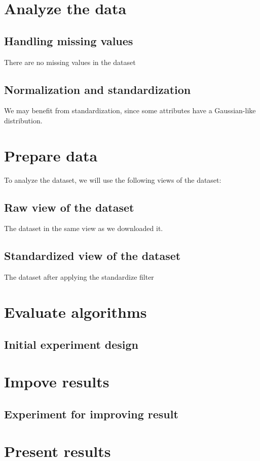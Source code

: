 \chapter{Analyze the data}
\section{Handling missing values}
There are no missing values in the dataset
\section{Normalization and standardization}
We may benefit from standardization, since some attributes have a Gaussian-like distribution.

\chapter{Prepare data}
To analyze the dataset, we will use the following views of the dataset:
\section{Raw view of the dataset}
The dataset in the same view as we downloaded it.
\section{Standardized view of the dataset}
The dataset after applying the standardize filter

\chapter{Evaluate algorithms}
\section{Initial experiment design}

\chapter{Impove results}
\section{Experiment for improving result}

\chapter{Present results}